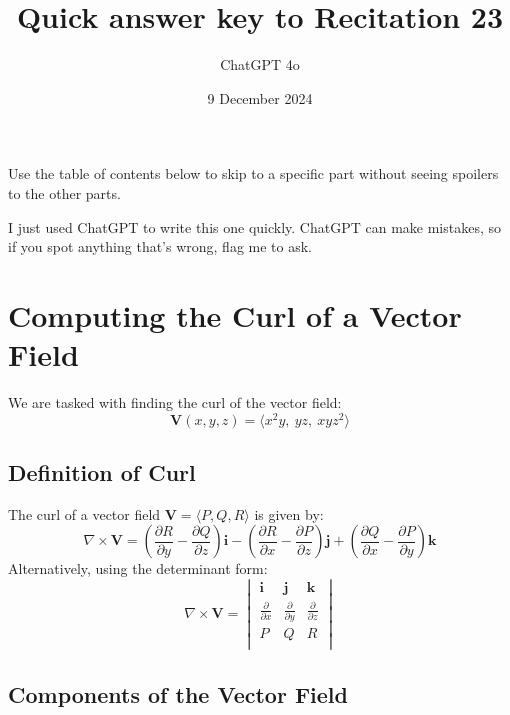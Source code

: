 \documentclass[11pt]{article}
\begin{document}
\title{Quick answer key to Recitation 23}
\author{ChatGPT 4o}
\date{9 December 2024}
\maketitle

Use the table of contents below to skip to a specific part
without seeing spoilers to the other parts.

I just used ChatGPT to write this one quickly.
ChatGPT can make mistakes, so if you spot anything that's wrong, flag me to ask.

\tableofcontents



\newpage

\section{Computing the Curl of a Vector Field}

We are tasked with finding the curl of the vector field:
\[
\mathbf{V}(x, y, z) = \langle x^2 y, \ yz, \ x y z^2 \rangle
\]

\newpage

\subsection{Definition of Curl}

The curl of a vector field \( \mathbf{V} = \langle P, Q, R \rangle \) is given by:
\[
\nabla \times \mathbf{V} = \left( \frac{\partial R}{\partial y} - \frac{\partial Q}{\partial z} \right) \mathbf{i} - \left( \frac{\partial R}{\partial x} - \frac{\partial P}{\partial z} \right) \mathbf{j} + \left( \frac{\partial Q}{\partial x} - \frac{\partial P}{\partial y} \right) \mathbf{k}
\]
Alternatively, using the determinant form:
\[
\nabla \times \mathbf{V} =
\begin{vmatrix}
\mathbf{i} & \mathbf{j} & \mathbf{k} \\
\frac{\partial}{\partial x} & \frac{\partial}{\partial y} & \frac{\partial}{\partial z} \\
P & Q & R \\
\end{vmatrix}
\]

\newpage

\subsection{Components of the Vector Field}
\end{document}
